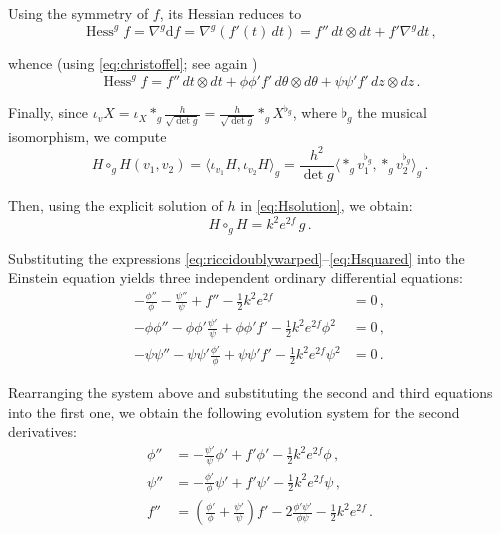 \documentclass[12pt,a4paper,reqno]{amsart}
\theoremstyle{plain}
\theoremstyle{remark}
\numberwithin{equation}{section}
\newcommand{\dd}{\mathrm{d}}
\DeclareMathOperator{\Hess}{\mathrm{Hess}}
\begin{document}
Using the symmetry of $f$, its Hessian reduces to
\begin{equation*}
\Hess^g f = \nabla^g \dd f = \nabla^g (f'(t)\,dt) = f'' \,dt \otimes dt + f' \nabla^g dt \,,
\end{equation*}

whence (using \eqref{eq:christoffel}; see again \cite[\S 4.2.4]{Petersen2016})
\begin{equation}\label{eq:Hessianf}
\Hess^g f = f'' \,dt \otimes dt + \phi\phi' f' \,d\theta \otimes d\theta + \psi\psi' f' \,dz \otimes dz \,.
\end{equation}

Finally, since $\iota_vX = \iota_X \ast_g \frac{h}{\sqrt{\det g}} = \frac{h}{\sqrt{\det g}} \ast_g X^{\flat_g}$, where $\flat_g$ the musical isomorphism, we compute
\begin{equation*}
H \circ_g H(v_1,v_2) = \langle \iota_{v_1}H, \iota_{v_2}H \rangle_g = \frac{h^2}{\det g} \langle \ast_g v_1^{\flat_g}, \ast_g v_2^{\flat_g} \rangle_g \,.
\end{equation*}

Then, using the explicit solution of $h$ in \eqref{eq:Hsolution}, we obtain:
\begin{equation}\label{eq:Hsquared}
H \circ_g H = k^2 e^{2f} \,g \,.
\end{equation}

Substituting the expressions \eqref{eq:riccidoublywarped}--\eqref{eq:Hsquared} into the Einstein equation yields three independent ordinary differential equations:
\begin{align*}
-\frac{\phi''}{\phi} - \frac{\psi''}{\psi} + f'' - \frac{1}{2}k^2 e^{2f} &= 0 \,, \\
-\phi\phi'' - \phi\phi' \frac{\psi'}{\psi} + \phi\phi' f' - \frac{1}{2}k^2 e^{2f} \phi^2 &= 0 \,, \\
-\psi\psi'' - \psi\psi' \frac{\phi'}{\phi} + \psi\psi' f' - \frac{1}{2}k^2 e^{2f} \psi^2 &= 0 \,.
\end{align*}

Rearranging the system above and substituting the second and third equations into the first one, we obtain the following evolution system for the second derivatives:
\begin{align}
\phi'' &= -\frac{\psi'}{\psi} \phi' + f' \phi' - \frac{1}{2}k^2 e^{2f} \phi \,, \label{eq:phi''} \\
\psi'' &= -\frac{\phi'}{\phi} \psi' + f' \psi' - \frac{1}{2}k^2 e^{2f} \psi \,, \label{eq:psi''} \\
f'' &= \left(\frac{\phi'}{\phi} + \frac{\psi'}{\psi}\right) f' - 2\frac{\phi'\psi'}{\phi\psi} - \frac{1}{2}k^2 e^{2f} \,. \label{eq:f''}
\end{align}
\end{document}
